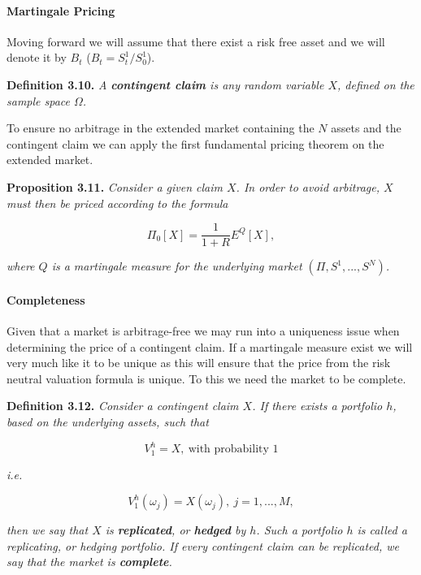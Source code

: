 \documentclass[
]{article}
\begin{document}
\hypertarget{martingale-pricing}{%
\paragraph{Martingale Pricing}\label{martingale-pricing}}

Moving forward we will assume that there exist a risk free asset and we
will denote it by \(B_t\) (\(B_t=S^1_t/S^1_0\)).

\textbf{Definition 3.10.} \emph{A \textbf{contingent claim} is any
random variable \(X\), defined on the sample space \(\Omega\).}

To ensure no arbitrage in the extended market containing the \(N\)
assets and the contingent claim we can apply the first fundamental
pricing theorem on the extended market.

\textbf{Proposition 3.11.} \emph{Consider a given claim \(X\). In order
to avoid arbitrage, \(X\) must then be priced according to the formula}

\[
\Pi_0[X]=\frac{1}{1+R}E^Q[X],\tag{3.10}
\]

\emph{where \(Q\) is a martingale measure for the underlying market
\((\Pi,S^1,...,S^N)\).}

\hypertarget{completeness}{%
\paragraph{Completeness}\label{completeness}}

Given that a market is arbitrage-free we may run into a uniqueness issue
when determining the price of a contingent claim. If a martingale
measure exist we will very much like it to be unique as this will ensure
that the price from the risk neutral valuation formula is unique. To
this we need the market to be complete.

\textbf{Definition 3.12.} \emph{Consider a contingent claim \(X\). If
there exists a portfolio \(h\), based on the underlying assets, such
that}

\[
V_1^h=X,\ \text{with probability 1}\tag{3.11}
\]

\emph{i.e.}

\[
V_1^h(\omega_j)=X(\omega_j),\ j=1,...,M,\tag{3.12}
\]

\emph{then we say that \(X\) is \textbf{replicated}, or \textbf{hedged}
by \(h\). Such a portfolio \(h\) is called a replicating, or hedging
portfolio. If every contingent claim can be replicated, we say that the
market is \textbf{complete}.}
\end{document}
